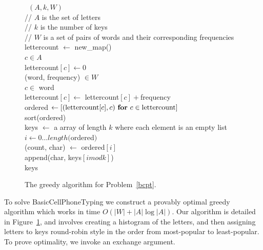 \documentclass[runningheads]{llncs}
\begin{document}
\begin{figure}
\begin{algorithm}
~$(A, k, W)$\+\\
    // $A$ is the set of letters \\
    // $k$ is the number of keys \\
    // $W$ is a set of pairs of words and their corresponding frequencies \\
    lettercount $\gets$ new\_map() \\
    \For $c \in A$\+\\
        lettercount$[c] \gets 0$\-\\
    \For (word, frequency) $\in W$\+\\
        \For $c \in$ word \+\\
            lettercount$[c] \gets $ lettercount$[c] +$frequency\-\-\\
    ordered $\gets \left[ ({\rm lettercount}[c], c)~\For c \in {\rm lettercount} \right]$\\
    sort(ordered)\\
    keys $\gets$ a array of length $k$ where each element is an empty list\\
    \For $i \gets 0 \ldots length($ordered$)$\+\\
        (count, char) $\gets$ ordered$[i]$\\
        append(char, keys$[i mod k]$)\-\\
    \Return keys
\end{algorithm}
\caption{The greedy algorithm for Problem~\ref{bcpt}.}
\label{greedyalg}
\end{figure}

To solve {\sc BasicCellPhoneTyping} we construct a provably optimal
greedy algorithm which works in time $O(|W| + |A| \log |A|)$.  Our algorithm is
detailed in Figure~\ref{greedyalg}, and involves creating a histogram of the
letters, and then assigning letters to keys round-robin style in the order from
most-popular to least-popular.  To prove optimality, we invoke an exchange argument.
\end{document}
